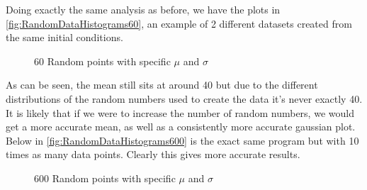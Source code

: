 \documentclass[12pt]{article}
\begin{document}
\begin{itemize}
        Doing exactly the same analysis as before, we have the plots in \autoref{fig:RandomDataHistograms60}, 
        an example of 2 different datasets created from the same initial conditions.

        \begin{figure}[H]%
            \centering
            \subfloat{\scalebox{0.45}{}}%
            \qquad
            \subfloat{\scalebox{0.45}{}}%
            \caption{60 Random points with specific $\mu$ and $\sigma$}
            \label{fig:RandomDataHistograms60}
        \end{figure}
        
        \noindent
        As can be seen, the mean still sits at around 40 but due to the different distributions of 
        the random numbers used to create the data it's never exactly 40. It is likely that if we 
        were to increase the number of random numbers, we would get a more accurate mean, as well as 
        a consistently more accurate gaussian plot. Below in \autoref{fig:RandomDataHistograms600} 
        is the exact same program but with 10 times as many data points. Clearly this gives more 
        accurate results.

        \begin{figure}[H]%
            \centering
            \subfloat{\scalebox{0.45}{}}%
            \qquad
            \subfloat{\scalebox{0.45}{}}%
            \caption{600 Random points with specific $\mu$ and $\sigma$}
            \label{fig:RandomDataHistograms600}
        \end{figure}


\end{itemize}
\end{document}
